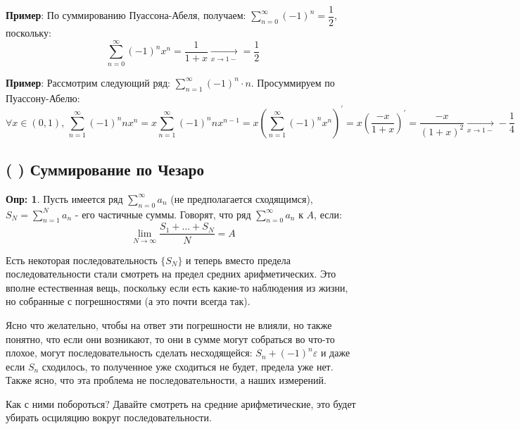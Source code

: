 \documentclass[12pt]{article}
\newcommand{\RN}[1]{%
	\textup{\uppercase\expandafter{\romannumeral#1}}%
}
\newcommand{\VE}{\varepsilon}
\theoremstyle{definition}
\newtheorem{defn}{Опр:}
\newcommand{\ddsum}[2]{\displaystyle\sum\limits_{#1}^{#2}}
\begin{document}
\textbf{Пример}: По суммированию Пуассона-Абеля, получаем: $\ddsum{n = 0}{\infty}(-1)^n = \dfrac{1}{2}$, поскольку:
$$
	\ddsum{n = 0}{\infty}(-1)^nx^n = \dfrac{1}{1+x} \xrightarrow[x \to 1-]{} = \dfrac{1}{2}
$$

\textbf{Пример}: Рассмотрим следующий ряд: $\ddsum{n = 1}{\infty}(-1)^n{\cdot}n$. Просуммируем по Пуассону-Абелю:
$$
	\forall x \in (0,1), \, \ddsum{n = 1}{\infty}(-1)^nnx^n = x\ddsum{n = 1}{\infty} (-1)^n nx^{n-1} = x \left(\ddsum{n = 1}{\infty}(-1)^n x^n\right)^\prime = x \left(\dfrac{-x}{1+x}\right)^\prime = \dfrac{-x}{(1+x)^2} \xrightarrow[x \to 1-]{} -\dfrac{1}{4}
$$

\subsection*{(\RN{2}) Суммирование по Чезаро}

\begin{defn}
	Пусть имеется ряд $\ddsum{n = 0}{\infty}a_n$ (не предполагается сходящимся), $S_N = \ddsum{n = 1}{N}a_n$ - его частичные суммы. Говорят, что ряд $\ddsum{n = 0}{\infty}a_n$  к $A$, если:
	$$
		\lim\limits_{N \to \infty}\dfrac{S_1 + \dotsc + S_N}{N} = A
	$$
\end{defn}
Есть некоторая последовательность $\{S_N\}$ и теперь вместо предела последовательности стали смотреть на предел средних арифметических. Это вполне естественная вещь, поскольку если есть какие-то наблюдения из жизни, но собранные с погрешностями (а это почти всегда так). 

Ясно что желательно, чтобы на ответ эти погрешности не влияли, но также понятно, что если они возникают, то они в сумме могут собраться во что-то плохое, могут последовательность сделать несходящейся: $S_n + (-1)^n \VE$ и даже если $S_n$ сходилось, то полученное уже сходиться не будет, предела уже нет. Также ясно, что эта проблема не последовательности, а наших измерений. 

Как с ними побороться? Давайте смотреть на средние арифметические, это будет убирать осциляцию вокруг последовательности.
\end{document}
